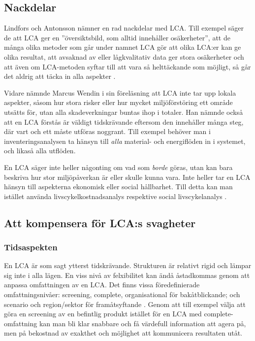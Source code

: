 \documentclass{article}
\begin{document}
\subsection{Nackdelar}

Lindfors och Antonsson nämner en rad nackdelar med LCA. Till exempel säger de att LCA ger en ''översikts\-bild, som alltid innehåller osäkerheter'', att de många olika metoder som går under namnet LCA gör att olika LCA:er kan ge olika resultat, att avsaknad av eller lågkvalitativ data ger stora osäkerheter och att även om LCA-metoden syftar till att vara så helttäckande som möjligt, så går det aldrig att täcka in alla aspekter .

Vidare nämnde Marcus Wendin i sin föreläsning att LCA inte tar upp lokala aspekter, såsom hur stora risker eller hur mycket miljöförstöring ett område utsätts för, utan alla skadeverkningar buntas ihop i totaler. Han nämnde också att en LCA förstås är väldigt tidskrävande eftersom den innehåller många steg, där vart och ett måste utföras noggrant. Till exempel behöver man i inventeringsanalysen ta hänsyn till \emph{alla} material- och energiflöden in i systemet, och likaså alla utflöden.

En LCA säger inte heller någonting om vad som \emph{borde} göras, utan kan bara beskriva hur stor miljö\-påverkan är eller skulle kunna vara. Inte heller tar en LCA hänsyn till aspekterna ekonomisk eller social hållbarhet. Till detta kan man istället använda livscykelkostnadsanalys respektive social livscykelanalys . 

\subsection{Att kompensera för LCA:s svagheter}

\subsubsection{Tidsaspekten}

En LCA är som sagt ytterst tidskrävande. Strukturen är relativt rigid och lämpar sig inte i alla lägen. En viss nivå av felxibilitet kan ändå åstadkommas genom att anpassa omfattningen av en LCA. Det finns vissa föredefinierade omfattningsnivåer:  screening, complete, organisational för bakåtblickande; och scenario och region/sektor för framåtsyftande . Genom att till exempel välja att göra en screening av en befintlig produkt istället för en LCA med complete-omfattning kan man bli klar snabbare och få värdefull information att agera på, men på bekostnad av exakthet och möjlighet att kommunicera resultaten utåt.
\end{document}

